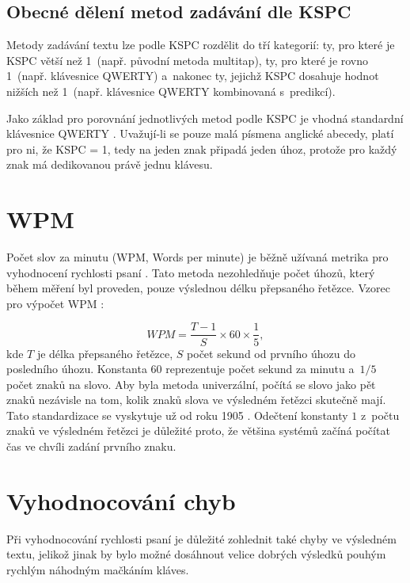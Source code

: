 \documentclass[a4paper,11pt,openany]{book} %
\begin{document}
\subsection{Obecné dělení metod zadávání dle KSPC}

Metody zadávání textu lze podle KSPC rozdělit do tří kategorií: ty, pro které je KSPC větší než 1~(např. původní metoda multitap), ty, pro které je rovno 1~(např. klávesnice QWERTY) a~nakonec ty, jejichž KSPC dosahuje hodnot nižších než 1~(např. klávesnice QWERTY kombinovaná s~predikcí). %

Jako základ pro porovnání jednotlivých metod podle KSPC je vhodná standardní klávesnice QWERTY \parencite{arif2009analysis}. %
Uvažují-li se pouze malá písmena anglické abecedy, platí pro ni, že KSPC = 1, tedy na jeden znak připadá jeden úhoz, protože pro každý znak má dedikovanou právě jednu klávesu.

\section{WPM}

Počet slov za minutu (WPM, Words per minute) je běžně užívaná metrika pro vyhodnocení rychlosti psaní \parencite{tarvainen2010beginner}. %
Tato metoda nezohledňuje počet úhozů, který během měření byl proveden, pouze výslednou délku přepsaného řetězce. Vzorec pro výpočet WPM \parencite[48]{wobbrockjacobo.2007}:

\[
	WPM = \frac{T - 1}{S} \times 60 \times \frac{1}{5},
\]
kde $T$ je délka přepsaného řetězce, $S$ počet sekund od prvního úhozu do posledního úhozu. Konstanta $60$ reprezentuje počet sekund za minutu a~$1/5$ počet znaků na slovo. Aby byla metoda univerzální, počítá se slovo jako pět znaků nezávisle na tom, kolik znaků slova ve výsledném řetězci skutečně mají. Tato standardizace se vyskytuje už od roku 1905 \parencite{yamada1980historical}. Odečtení konstanty $1$ z~počtu znaků ve výsledném řetězci je důležité proto, že většina systémů začíná počítat čas ve chvíli zadání prvního znaku. \parencite[49]{wobbrockjacobo.2007}

\section{Vyhodnocování chyb}

Při vyhodnocování rychlosti psaní je důležité zohlednit také chyby ve výsledném textu, jelikož jinak by bylo možné dosáhnout velice dobrých výsledků pouhým rychlým náhodným mačkáním kláves.
\end{document}
